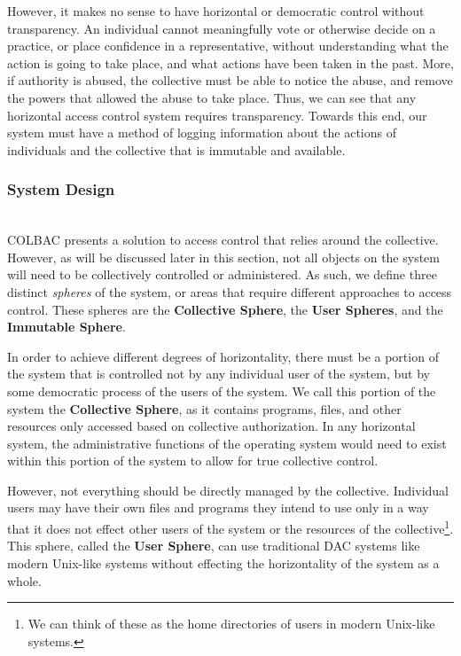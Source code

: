 However, it makes no sense to have horizontal or democratic control without
transparency. An individual cannot meaningfully vote or otherwise decide on a
practice, or place confidence in a representative, without understanding what
the action is going to take place, and what actions have been taken in the past.
More, if authority is abused, the collective must be able to notice the abuse,
and remove the powers that allowed the abuse to take place. Thus, we can see
that any horizontal access control system requires transparency. Towards this
end, our system must have a method of logging information about the actions of
individuals and the collective that is immutable and available.

\subsubsection{System Design}
\label{sec:colbacdesign}
\mbox{}\\
COLBAC presents a solution to access control that relies around the collective.
However, as will be discussed later in this section, not all objects on the
system will need to be collectively controlled or administered. As such, we
define three distinct \textit{spheres} of the system, or areas that require
different approaches to access control. These spheres are the \textbf{Collective
Sphere}, the \textbf{User Spheres}, and the \textbf{Immutable Sphere}.

In order to achieve different degrees of horizontality, there must be a portion
of the system that is controlled not by any individual user of the system, but
by some democratic process of the users of the system. We call this portion of
the system the \textbf{Collective Sphere}, as it contains programs, files, and
other resources only accessed based on collective authorization. In any
horizontal system, the administrative functions of the operating system would
need to exist within this portion of the system to allow for true collective
control.

However, not everything should be directly managed by the collective. Individual
users may have their own files and programs they intend to use only in a way
that it does not effect other users of the system or the resources of the
collective\footnote{We can think of these as the home directories of users in
modern Unix-like systems.}. This sphere, called the \textbf{User Sphere},
can use traditional DAC systems like modern Unix-like systems without effecting
the horizontality of the system as a whole.

